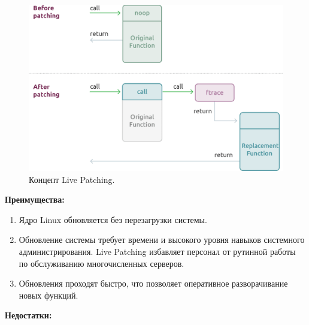 \begin{figure}[H]
    \centering
    \includegraphics[scale=0.75, width=\textwidth]{inc/img/Livepatch}
    \caption{Концепт Live Patching\cite{livepatch-pic}.}
    \label{fig:Livepatch}
\end{figure}

\textbf{Преимущества:}

\begin{enumerate}
    \item Ядро Linux обновляется без перезагрузки системы.
    \item Обновление системы требует времени и высокого уровня навыков системного администрирования.
    Live Patching избавляет персонал от рутинной работы по обслуживанию многочисленных серверов.
    \item Обновления проходят быстро, что позволяет оперативное разворачивание новых функций.
\end{enumerate}

\textbf{Недостатки:}

